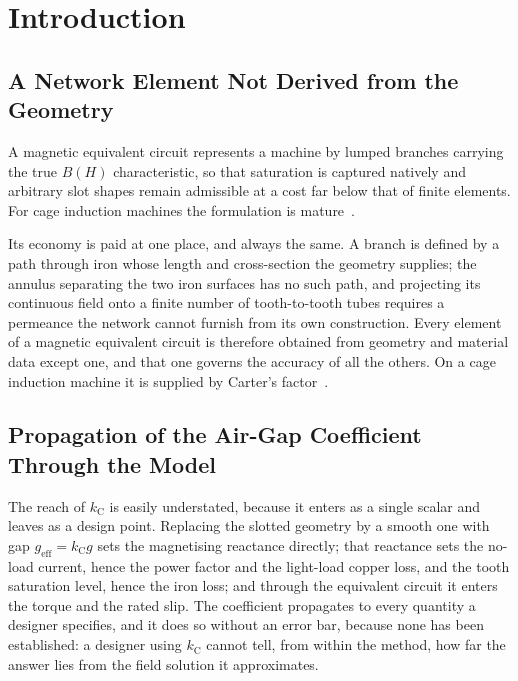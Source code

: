 \documentclass[10pt,a4paper,twocolumn]{article}
\theoremstyle{plain}
\theoremstyle{remark}
\begin{document}
\clearpage
\section{Introduction}
\label{sec:intro}

\subsection{A Network Element Not Derived from the Geometry}

A magnetic equivalent circuit represents a machine by lumped branches
carrying the true $B(H)$ characteristic, so that saturation is captured
natively and arbitrary slot shapes remain admissible at a cost far below
that of finite elements. For cage induction machines the formulation is
mature~\cite{ostovic1989,ostovic1986,perho2002,hosseini2026}.

Its economy is paid at one place, and always the same. A branch is
defined by a path through iron whose length and cross-section the
geometry supplies; the annulus separating the two iron surfaces has no
such path, and projecting its continuous field onto a finite number of
tooth-to-tooth tubes requires a permeance the network cannot furnish
from its own construction. Every element of a magnetic equivalent
circuit is therefore obtained from geometry and material data except
one, and that one governs the accuracy of all the others. On a cage
induction machine it is supplied by Carter's factor~\cite{carter}.

\subsection{Propagation of the Air-Gap Coefficient Through the Model}

The reach of $k_{\mathrm{C}}$ is easily understated, because it enters
as a single scalar and leaves as a design point. Replacing the slotted
geometry by a smooth one with gap $g_{\mathrm{eff}}=k_{\mathrm{C}}g$
sets the magnetising reactance directly; that reactance sets the no-load
current, hence the power factor and the light-load copper loss, and the
tooth saturation level, hence the iron loss; and through the equivalent
circuit it enters the torque and the rated slip. The coefficient
propagates to every quantity a designer specifies, and it does so
without an error bar, because none has been established: a designer
using $k_{\mathrm{C}}$ cannot tell, from within the method, how far the
answer lies from the field solution it approximates.
\end{document}
